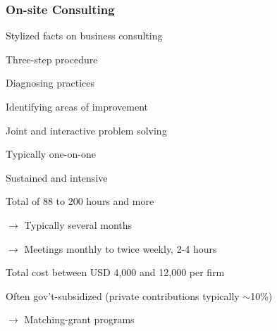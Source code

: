 \documentclass[hideothersubsections, usenames,dvipsnames,11pt]{beamer}
\newenvironment{itemize_2pt}{\itemize\addtolength{\itemsep}{2pt}}{\enditemize}
\newenvironment{enumerate_2pt}{\enumerate\addtolength{\itemsep}{2pt}}{\endenumerate}
\begin{document}
\begin{frame}
\frametitle{On-site Consulting}

Stylized facts on business consulting
\begin{itemize_2pt}
	\item Three-step procedure
	\begin{enumerate_2pt}
		\item Diagnosing practices
		\item Identifying areas of improvement
		\item Joint and interactive problem solving
	\end{enumerate_2pt}
	
	\pause
	
	\item Typically one-on-one \citep[also group-based; see,][]{McKenzie2021b}
	
	\item \textcolor{bdf}{Sustained and intensive}
	\begin{itemize_2pt}
		\item Total of 88 to 200 hours and more \citep{Anderson2020, Bruhn2018} %
		\item[] $\rightarrow$ Typically several months
		\item[] $\rightarrow$ Meetings monthly to twice weekly, 2-4 hours
		\item Total cost between \textcolor{bdf}{USD 4,000 and 12,000 per firm} \citep{Anderson2020, Bruhn2018}
	\end{itemize_2pt}
	
	\item \textcolor{bdf}{Often gov't-subsidized} (private contributions typically $\sim$10\%) \\
	\begin{itemize_2pt}
		\item[] $\rightarrow$ \textcolor{bdf}{Matching-grant programs}
	\end{itemize_2pt}
	
\end{itemize_2pt}
\end{frame}
\end{document}
